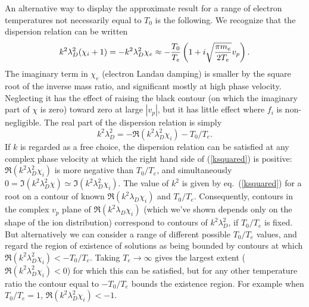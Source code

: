 \documentclass[12pt]{article}
\begin{document}
An alternative way to display the approximate result for a range of
electron temperatures not necessarily equal to $T_0$ is the following.
We recognize that the dispersion relation can be written
\begin{equation}
  \label{dispersion}
   k^2\lambda_D^2(\chi_i+1) = - k^2\lambda_D^2\chi_e
\approx - {T_0\over T_e}\left(1+i \sqrt{\pi m_e\over
    2 T_e}v_p\right).
\end{equation}
The imaginary term in $\chi_e$ (electron Landau
damping) is smaller by the square root of the inverse mass ratio, and
significant mostly at high phase velocity. Neglecting it has the
effect of raising the black contour (on which the imaginary part of
$\chi$ is zero) toward zero at large $|v_p|$, but it has little effect
where $f_i$ is non-negligible. The real part of the dispersion
relation is simply 
\begin{equation}
  \label{ksquared}
  k^2\lambda_D^2 = -\Re(k^2\lambda_D^2\chi_i )-T_0/T_e.
\end{equation}
If $k$ is regarded as a free choice, the dispersion relation can be
satisfied at any complex phase velocity at which the right hand side
of (\ref{ksquared}) is positive: $\Re(k^2\lambda_D^2\chi_i)$ is more
negative than $T_0/T_e$, and simultaneously
$0=\Im(k^2\lambda_D^2\chi)\simeq\Im(k^2\lambda_D^2\chi_i )$. The value
of $k^2$ is given by eq.\ (\ref{ksquared}) for a root on a contour of
known $\Re(k^2\lambda_D\chi_i)$ and $T_0/T_e$.  Consequently, contours
in the complex $v_p$ plane of $\Re(k^2\lambda_D\chi_i)$ (which we've
shown depends only on the shape of the ion distribution) correspond to
contours of $k^2\lambda_D^2$, if $T_0/T_e$ is fixed. But alternatively
we can consider a range of different possible $T_0/T_e$ values, and
regard the region of existence of solutions as being bounded by
contours at which $\Re(k^2\lambda_D^2\chi_i)<-T_0/T_e$. Taking
$T_e\to \infty$ gives the largest extent
($\Re(k^2\lambda_D^2\chi_i)<0$) for which this can be satisfied, but
for any other temperature ratio the contour equal to $-T_0/T_e$ bounds
the existence region. For example when $T_0/T_e=1$, $\Re(k^2\lambda_D^2\chi_i)<-1$.
\end{document}
